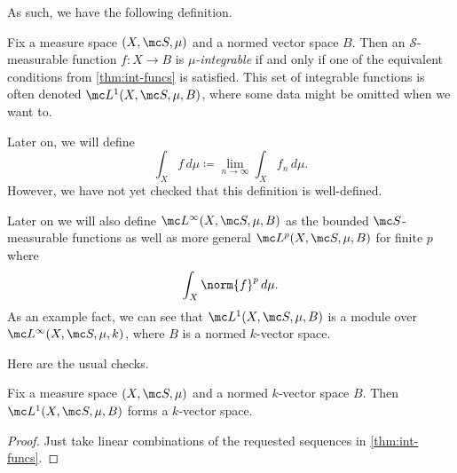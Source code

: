 \documentclass[../notes.tex]{subfiles}
\begin{document}
As such, we have the following definition.
\begin{definition}[Integrable]
	Fix a measure space $(X,\mc S,\mu)$ and a normed vector space $B$. Then an $\mathcal S$-measurable function $f\colon X\to B$ is \textit{$\mu$-integrable} if and only if one of the equivalent conditions from \autoref{thm:int-funcs} is satisfied. This set of integrable functions is often denoted $\mc L^1(X,\mc S,\mu,B)$, where some data might be omitted when we want to.
\end{definition}
\begin{remark}
	Later on, we will define
	\[\int_X f\,d\mu\coloneqq\lim_{n\to\infty}\int_Xf_n\,d\mu.\]
	However, we have not yet checked that this definition is well-defined.
\end{remark}
\begin{remark}
	Later on we will also define $\mc L^\infty(X,\mc S,\mu,B)$ as the bounded $\mc S$-measurable functions as well as more general $\mc L^p(X,\mc S,\mu,B)$ for finite $p$ where
	\[\int_X\norm{f}^p\,d\mu.\]
	As an example fact, we can see that $\mc L^1(X,\mc S,\mu,B)$ is a module over $\mc L^\infty(X,\mc S,\mu,k)$, where $B$ is a normed $k$-vector space.
\end{remark}
Here are the usual checks.
\begin{lemma}
	Fix a measure space $(X,\mc S,\mu)$ and a normed $k$-vector space $B$. Then $\mc L^1(X,\mc S,\mu,B)$ forms a $k$-vector space.
\end{lemma}
\begin{proof}
	Just take linear combinations of the requested sequences in \autoref{thm:int-funcs}.
\end{proof}
\end{document}

